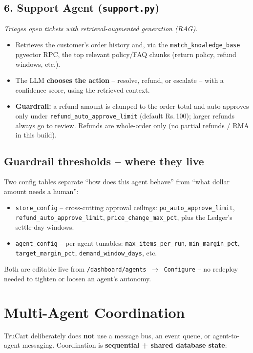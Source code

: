 \documentclass[11pt,a4paper]{article}
\newcommand{\Rs}{Rs.\,}
\newcommand{\agenthead}[2]{%
  \subsection*{\textcolor{accent}{#1}}%
  \textit{#2}\par\vspace{2pt}
}
\begin{document}
\agenthead{6. Support Agent (\texttt{support.py})}{Triages open tickets with retrieval-augmented
generation (RAG).}
\begin{itemize}[itemsep=1pt]
\item Retrieves the customer's order history and, via the \texttt{match\_knowledge\_base}
pgvector RPC, the top relevant policy/FAQ chunks (return policy, refund windows, etc.).
\item The LLM \textbf{chooses the action} -- resolve, refund, or escalate -- with a confidence
score, using the retrieved context.
\item \textbf{Guardrail:} a refund amount is clamped to the order total and auto-approves only
under \texttt{refund\_auto\_approve\_limit} (default \Rs{}100); larger refunds always go
to review. Refunds are whole-order only (no partial refunds / RMA in this build).
\end{itemize}

\subsection{Guardrail thresholds -- where they live}
Two config tables separate ``how does this agent behave'' from ``what dollar amount needs a
human'':
\begin{itemize}[itemsep=1pt]
\item \texttt{store\_config} -- cross-cutting approval ceilings:
\texttt{po\_auto\_approve\_limit}, \texttt{refund\_auto\_approve\_limit},
\texttt{price\_change\_max\_pct}, plus the Ledger's settle-day windows.
\item \texttt{agent\_config} -- per-agent tunables: \texttt{max\_items\_per\_run},
\texttt{min\_margin\_pct}, \texttt{target\_margin\_pct}, \texttt{demand\_window\_days}, etc.
\end{itemize}
Both are editable live from \texttt{/dashboard/agents $\to$ Configure} -- no redeploy needed to
tighten or loosen an agent's autonomy.

\section{Multi-Agent Coordination}
\label{sec:coordination}

TruCart deliberately does \textbf{not} use a message bus, an event queue, or agent-to-agent
messaging. Coordination is \textbf{sequential + shared database state}:
\end{document}

